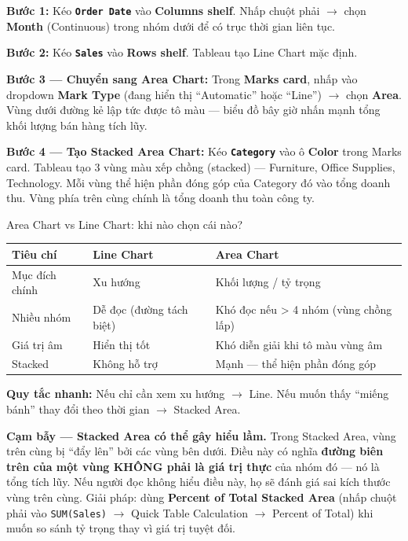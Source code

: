 \documentclass[12pt]{article}
\begin{document}
\noindent \textbf{Bước 1:} Kéo \textbf{\texttt{Order Date}} vào \textbf{Columns shelf}. Nhấp chuột phải $\rightarrow$ chọn \textbf{Month} (Continuous) trong nhóm dưới để có trục thời gian liên tục.

\noindent \textbf{Bước 2:} Kéo \textbf{\texttt{Sales}} vào \textbf{Rows shelf}. Tableau tạo Line Chart mặc định.

\noindent \textbf{Bước 3 --- Chuyển sang Area Chart:} Trong \textbf{Marks card}, nhấp vào dropdown \textbf{Mark Type} (đang hiển thị ``Automatic'' hoặc ``Line'') $\rightarrow$ chọn \textbf{Area}. Vùng dưới đường kẻ lập tức được tô màu --- biểu đồ bây giờ nhấn mạnh tổng khối lượng bán hàng tích lũy.

\noindent \textbf{Bước 4 --- Tạo Stacked Area Chart:} Kéo \textbf{\texttt{Category}} vào ô \textbf{Color} trong Marks card. Tableau tạo 3 vùng màu xếp chồng (stacked) --- Furniture, Office Supplies, Technology. Mỗi vùng thể hiện phần đóng góp của Category đó vào tổng doanh thu. Vùng phía trên cùng chính là tổng doanh thu toàn công ty.

\begin{guidelinebox}{Area Chart vs Line Chart: khi nào chọn cái nào?}
\renewcommand{\arraystretch}{1.3}
\begin{tabularx}{\linewidth}{l X X}
\toprule
\textbf{Tiêu chí} & \textbf{Line Chart} & \textbf{Area Chart} \\
\midrule
Mục đích chính & Xu hướng & Khối lượng / tỷ trọng \\
Nhiều nhóm & Dễ đọc (đường tách biệt) & Khó đọc nếu > 4 nhóm (vùng chồng lấp) \\
Giá trị âm & Hiển thị tốt & Khó diễn giải khi tô màu vùng âm \\
Stacked & Không hỗ trợ & Mạnh --- thể hiện phần đóng góp \\
\bottomrule
\end{tabularx}

\noindent \textbf{Quy tắc nhanh:} Nếu chỉ cần xem xu hướng $\rightarrow$ Line. Nếu muốn thấy ``miếng bánh'' thay đổi theo thời gian $\rightarrow$ Stacked Area.
\end{guidelinebox}

\begin{notebox}
\textbf{Cạm bẫy --- Stacked Area có thể gây hiểu lầm.} Trong Stacked Area, vùng trên cùng bị ``đẩy lên'' bởi các vùng bên dưới. Điều này có nghĩa \textbf{đường biên trên của một vùng KHÔNG phải là giá trị thực} của nhóm đó --- nó là tổng tích lũy. Nếu người đọc không hiểu điều này, họ sẽ đánh giá sai kích thước vùng trên cùng. Giải pháp: dùng \textbf{Percent of Total Stacked Area} (nhấp chuột phải vào \texttt{SUM(Sales)} $\rightarrow$ Quick Table Calculation $\rightarrow$ Percent of Total) khi muốn so sánh tỷ trọng thay vì giá trị tuyệt đối.
\end{notebox}
\end{document}
